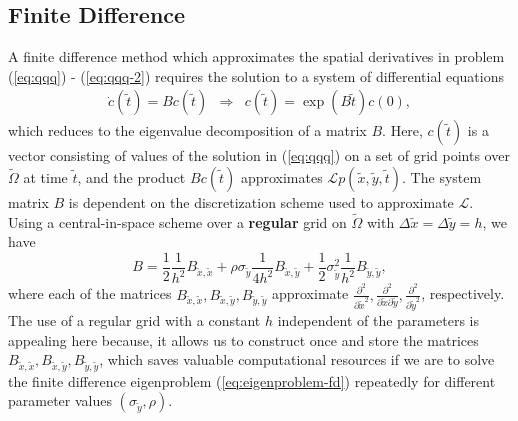 \subsection{Finite Difference} \label{sec:finite-difference} A finite
difference method which approximates the spatial derivatives in
problem (\ref{eq:qqq}) - (\ref{eq:qqq-2}) requires the solution to a
system of differential equations
\begin{align}
  \dot{c}(\tilde{t})= B c(\tilde{t}) &\Rightarrow& c(\tilde{t}) = \exp\left( B\tilde{t} \right)c(0) \label{eq:eigenproblem-fd},
\end{align}
which reduces to the eigenvalue decomposition of a matrix $B$. Here,
$c(\tilde{t})$ is a vector consisting of values of the solution in
(\ref{eq:qqq}) on a set of grid points over $\tilde{\Omega}$ at time
$\tilde{t}$, and the product $Bc(\tilde{t})$ approximates
$\mathcal{L}p(\tilde{x},\tilde{y},\tilde{t})$. The system matrix $B$
is dependent on the discretization scheme used to approximate
$\mathcal{L}$. Using a central-in-space scheme over a \textbf{regular}
grid on $\tilde{\Omega}$ with
$\Delta \tilde{x} = \Delta \tilde{y} = h$, we have
\[ B = \frac{1}{2} \frac{1}{h^2}B_{\tilde{x},\tilde{x}} +
  \rho\sigma_{\tilde{y}} \frac{1}{4h^2}B_{\tilde{x},\tilde{y}} + \frac{1}{2}\sigma_{\tilde{y}}^2
  \frac{1}{h^2}B_{\tilde{y},\tilde{y}},
\]
where each of the matrices
$B_{\tilde{x},\tilde{x}}, B_{\tilde{x},\tilde{y}},
B_{\tilde{y},\tilde{y}}$ approximate
$\frac{\partial^2}{\partial \tilde{x}^2}, \frac{\partial^2}{\partial
  \tilde{x} \partial \tilde{y}}, \frac{\partial^2}{\partial
  \tilde{y}^2}$, respectively.
The use of a regular grid with a constant $h$ independent of the
parameters is appealing here because, it allows us to construct once
and store the matrices
$B_{\tilde{x},\tilde{x}}, B_{\tilde{x},\tilde{y}},
B_{\tilde{y},\tilde{y}}$, which saves valuable computational resources
if we are to solve the finite difference eigenproblem
(\ref{eq:eigenproblem-fd}) repeatedly for different parameter values
$(\sigma_{\tilde{y}},\rho)$.

